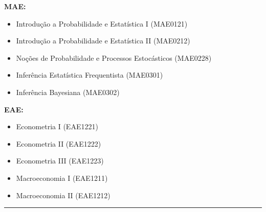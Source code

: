 \documentclass[12pt, a4paper]{article}
\begin{document}
\noindent\textbf{MAE:}
\begin{itemize}[leftmargin=2.5cm, topsep=2pt, itemsep=2pt]
    \item Introdução a Probabilidade e Estatística I \hfill (MAE0121)
    \item Introdução a Probabilidade e Estatística II \hfill (MAE0212)
    \item Noções de Probabilidade e Processos Estocásticos \hfill (MAE0228)
    \item Inferência Estatística Frequentista \hfill (MAE0301)
    \item Inferência Bayesiana \hfill (MAE0302)
\end{itemize}

\vspace{0.4cm}

\noindent\textbf{EAE:}
\begin{itemize}[leftmargin=2.5cm, topsep=2pt, itemsep=2pt]
    \item Econometria I \hfill (EAE1221)
    \item Econometria II \hfill (EAE1222)
    \item Econometria III \hfill (EAE1223)
    \item Macroeconomia I \hfill (EAE1211)
    \item Macroeconomia II \hfill (EAE1212)
\end{itemize}

\vspace{0.5cm}
\hrule
\end{document}
